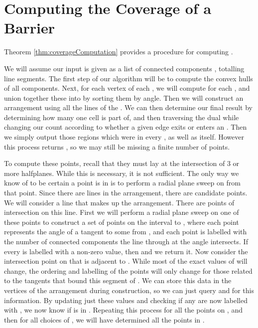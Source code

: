 \documentclass{cccg12}
\begin{document}
\begin{comment}It may seem that excluding the degenerate case of collinearity with a line segment served only to complicate things, but it was necessary to get a correct result. For instance, consider a barrier that is a series of collinear line segments. Using a more naive approach we would get the coverage to be the line all of these segments lie on. This is clearly not correct. Further, excluding these lines does not remove any information because the coverage and barrier are closed sets. It is impossible to have a gap in the coverage that can be plugged by the ``width" of exactly one line. Either there is no gap, or infinitely many lines can fit in the gap.
\end{comment}


\section{Computing the Coverage of a Barrier}

Theorem \ref{thm:coverageComputation} provides a procedure for computing .

We will assume our input is given as a list  of  connected components , totalling  line segments. The first step of our algorithm will be to compute the convex hulls of all  components. Next, for each vertex  of each , we will compute  for each , and union together these  into  by sorting them by angle. Then we will construct an arrangement using all the lines of the . We can then determine our final result by determining how many  one cell is part of, and then traversing the dual while changing our count according to whether a given edge exits or enters an . Then we simply output those regions which were in every , as well as  itself. However this process returns , so we may still be missing a finite number of points.

To compute these points, recall that they must lay at the intersection of 3 or more halfplanes. While this is necessary, it is not sufficient. The only way we know of to be certain a point is in  is to perform a radial plane sweep on  from that point. Since there are  lines in the arrangement, there are  candidate points. We will consider a line  that makes up the arrangement. There are  points of intersection on this line. First we will perform a radial plane sweep on one of these points  to construct a set  of points on the interval  to , where each point  represents the angle of a tangent to some  from , and each point is labelled with the number of connected components the line through  at the angle   intersects. If every  is labelled with a non-zero value, then  and we return it. Now consider the intersection point  on  that is adjacent to . While most of the exact values of  will change, the ordering and labelling of the points will only change for those related to the tangents that bound this segment of . We can store this data in the vertices of the arrangement during construction, so we can just query  and  for this information. By updating just these values and checking if any are now labelled with , we now know if  is in . Repeating this process for all the points on , and then for all choices of , we will have determined all the points in .
\end{document}
